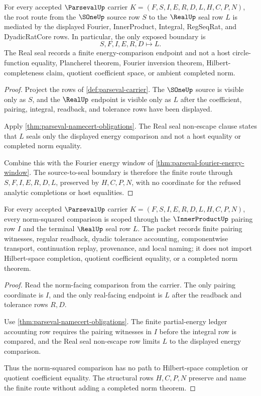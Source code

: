 \begin{theorem}
\label{thm:parseval-root-sone-real-seal-boundary}
For every accepted $\ParsevalUp$ carrier $K=(F,S,I,E,R,D,L,H,C,P,N)$, the root route from the $\SOneUp$ source row $S$ to the $\RealUp$ seal row $L$ is mediated by the displayed Fourier, InnerProduct, Integral, RegSeqRat, and DyadicRatCore rows. In particular, the only exposed boundary is
$$
S,F,I,E,R,D \longmapsto L .
$$
The Real seal records a finite energy-comparison endpoint and not a host circle-function equality, Plancherel theorem, Fourier inversion theorem, Hilbert-completeness claim, quotient coefficient space, or ambient completed norm.
\end{theorem}
\begin{proof}
Project the rows of \autoref{def:parseval-carrier}. The $\SOneUp$ source is visible only as $S$, and the $\RealUp$ endpoint is visible only as $L$ after the coefficient, pairing, integral, readback, and tolerance rows have been displayed.

Apply \autoref{thm:parseval-namecert-obligations}. The Real seal non-escape clause states that $L$ seals only the displayed energy comparison and not a host equality or completed norm equality.

Combine this with the Fourier energy window of \autoref{thm:parseval-fourier-energy-window}. The source-to-seal boundary is therefore the finite route through $S,F,I,E,R,D,L$, preserved by $H,C,P,N$, with no coordinate for the refused analytic completions or host equalities.
\end{proof}

\begin{theorem}
\label{thm:parseval-innerproduct-norm-scope}
For every accepted $\ParsevalUp$ carrier $K=(F,S,I,E,R,D,L,H,C,P,N)$, every norm-squared comparison is scoped through the $\InnerProductUp$ pairing row $I$ and the terminal $\RealUp$ seal row $L$. The packet records finite pairing witnesses, regular readback, dyadic tolerance accounting, componentwise transport, continuation replay, provenance, and local naming; it does not import Hilbert-space completion, quotient coefficient equality, or a completed norm theorem.
\end{theorem}
\begin{proof}
Read the norm-facing comparison from the carrier. The only pairing coordinate is $I$, and the only real-facing endpoint is $L$ after the readback and tolerance rows $R,D$.

Use \autoref{thm:parseval-namecert-obligations}. The finite partial-energy ledger accounting row requires the pairing witnesses in $I$ before the integral row is compared, and the Real seal non-escape row limits $L$ to the displayed energy comparison.

Thus the norm-squared comparison has no path to Hilbert-space completion or quotient coefficient equality. The structural rows $H,C,P,N$ preserve and name the finite route without adding a completed norm theorem.
\end{proof}

